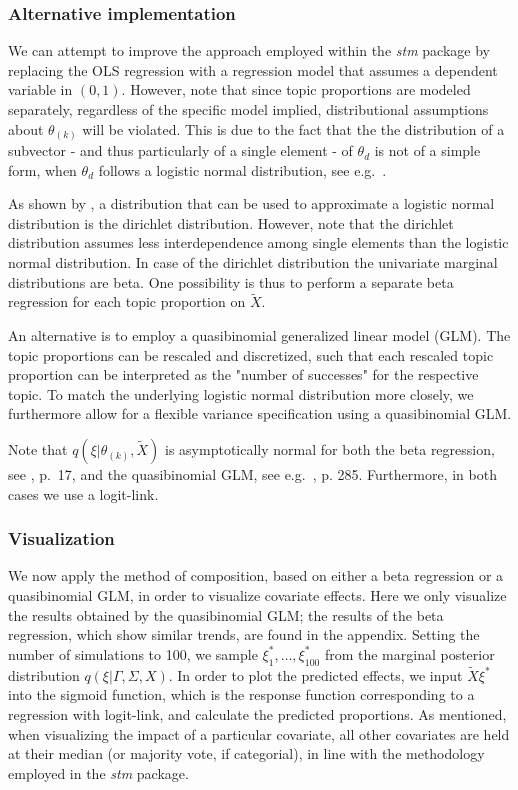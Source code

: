 \subsubsection{Alternative implementation}

We can attempt to improve the approach employed within the \textit{stm} package by replacing the OLS regression with a regression model that assumes a dependent variable in $(0,1)$. However, note that since topic proportions are modeled separately, regardless of the specific model implied, distributional assumptions about $\theta_{(k)}$ will be violated. This is due to the fact that the the distribution of a subvector - and thus particularly of a single element - of $\theta_d$ is not of a simple form, when $\theta_d$ follows a logistic normal distribution, see e.g.\ \cite{atchison1980logistic}.

As shown by \cite{atchison1980logistic}, a distribution that can be used to approximate a logistic normal distribution is the dirichlet distribution. However, note that the dirichlet distribution assumes less interdependence among single elements than the logistic normal distribution. In case of the dirichlet distribution the univariate marginal distributions are beta. One possibility is thus to perform a separate beta regression for each topic proportion on $\tilde{X}$. 

An alternative is to employ a quasibinomial generalized linear model (GLM). The topic proportions can be rescaled and discretized, such that each rescaled topic proportion can be interpreted as the "number of successes" for the respective topic. To match the underlying logistic normal distribution more closely, we furthermore allow for a flexible variance specification using a quasibinomial GLM.

Note that $q(\xi| \theta_{(k)}, \tilde{X})$ is asymptotically normal for both the beta regression, see \cite{ferrari2004beta}, p.\ 17, and the quasibinomial GLM, see e.g.\ \cite{fahrmeir2007regression}, p. 285. Furthermore, in both cases we use a logit-link.

\subsubsection{Visualization}

We now apply the method of composition, based on either a beta regression or a quasibinomial GLM, in order to visualize covariate effects. Here we only visualize the results obtained by the quasibinomial GLM; the results of the beta regression, which show similar trends, are found in the appendix. Setting the number of simulations to 100, we sample $\xi^*_1, \dots, \xi^*_{100}$ from the  marginal posterior distribution $q(\xi | \Gamma, \Sigma, X)$. In order to plot the predicted effects, we input $\tilde{X}\xi^*$ into the sigmoid function, which is the response function corresponding to a regression with logit-link, and calculate the predicted proportions. As mentioned, when visualizing the impact of a particular covariate, all other covariates are held at their median (or majority vote, if categorial), in line with the methodology employed in the \textit{stm} package.

